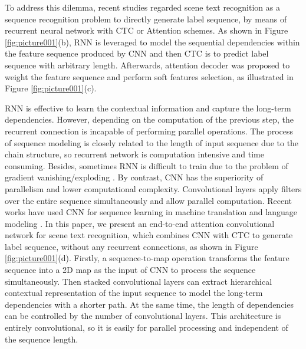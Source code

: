 \documentclass[letterpaper]{article} %
\begin{document}
To address this dilemma, recent studies \cite{shi2016end,lee2016recursive,shi2016robust} regarded scene text recognition as a sequence recognition problem to directly generate label sequence, by means of recurrent neural network with CTC \cite{graves2006connectionist} or Attention schemes. As shown in Figure \ref{fig:picture001}(b), RNN is leveraged to model the sequential dependencies within the feature sequence produced by CNN and then CTC is to predict label sequence with arbitrary length. Afterwards, attention decoder \cite{shi2016robust,lee2016recursive} was proposed to weight the feature sequence and perform soft features selection, as illustrated in Figure \ref{fig:picture001}(c). \par

RNN is effective to learn the contextual information and capture the long-term dependencies. However, depending on the computation of the previous step, the recurrent connection is incapable of performing parallel operations. The process of sequence modeling is closely related to the length of input sequence due to the chain structure, so recurrent network is computation intensive and time consuming. Besides, sometimes RNN is difficult to train due to the problem of gradient vanishing/exploding \cite{bengio1994learning}. By contrast, CNN has the superiority of parallelism and lower computational complexity. Convolutional layers apply filters over the entire sequence simultaneously and allow parallel computation. Recent works have used CNN for sequence learning in machine translation \cite{gehring2017convolutional} and language modeling \cite{dauphin2016language}. In this paper, we present an end-to-end attention convolutional network for scene text recognition, which combines CNN with CTC to generate label sequence, without any recurrent connections, as shown in Figure \ref{fig:picture001}(d). Firstly, a sequence-to-map operation transforms the feature sequence into a 2D map as the input of CNN to process the sequence simultaneously. Then stacked convolutional layers can extract hierarchical contextual representation of the input sequence to model the long-term dependencies with a shorter path. At the same time, the length of dependencies can be controlled by the number of convolutional layers. This architecture is entirely convolutional, so it is easily for parallel processing and independent of the sequence length. \par
\end{document}
